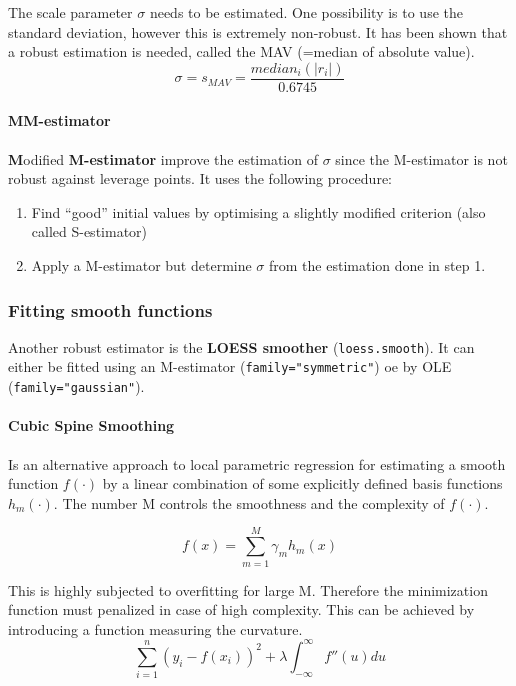The scale parameter $\sigma$ needs to be estimated. One possibility is to use the standard deviation, however this is extremely non-robust. It has been shown that a robust estimation is needed, called the MAV (=median of absolute value).
\begin{equation*}
	\sigma = s_{MAV} = \frac{median_i(|r_i|)}{0.6745}
\end{equation*}

\paragraph{MM-estimator}
\textbf{M}odified \textbf{M-estimator} improve the estimation of $\sigma$ since the M-estimator is not robust against leverage points. It uses the following procedure:
\begin{enumerate}
	\tightlist
	\item Find “good” initial values by optimising a slightly modified criterion (also called S-estimator)
	\item Apply a M-estimator but determine $\sigma$ from the estimation done in step 1.
\end{enumerate}

\subsubsection{Fitting smooth functions}
Another robust estimator is the \textbf{LOESS smoother} (\lstinline{loess.smooth}). It can either be fitted using an M-estimator (\lstinline{family="symmetric"}) oe by OLE (\lstinline{family="gaussian"}).

\paragraph{Cubic Spine Smoothing}
Is an alternative approach to local parametric regression for estimating a smooth function $f(\cdot)$ by a linear combination of some explicitly defined basis functions $h_m(\cdot)$. The number M controls the smoothness and the complexity of $f(\cdot)$.

\begin{equation*}
f(x) = \sum_{m=1}^{M}\gamma_m h_m(x)
\end{equation*}

This is highly subjected to overfitting for large M. Therefore the minimization function must penalized in case of high complexity. This can be achieved by introducing a function measuring the curvature.
\begin{equation*}
\sum_{i=1}^{n}(y_i-f(x_i))^2 + \lambda \int_{-\infty}^{\infty}f''(u) du
\end{equation*}

